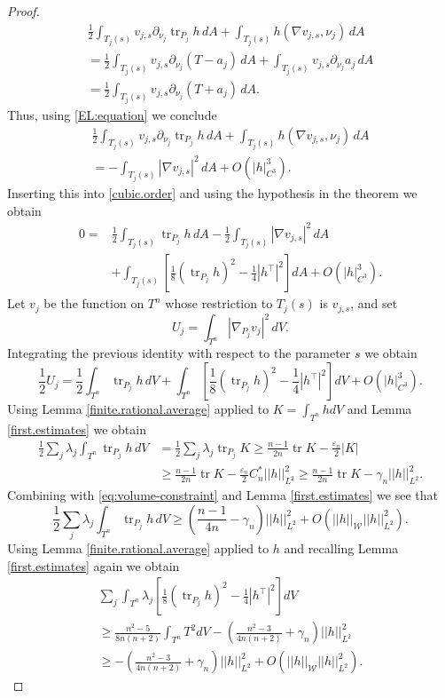 \documentclass[11pt]{amsart}
\def\tr{\operatorname{tr}}
\theoremstyle{remark}
\theoremstyle{definition}
\begin{document}
\begin{proof}
\begin{multline*}
			\frac12\int_{T_{j}(s)}v_{j,s}\partial_{\nu_j}\tr _{P_j} h\,dA+\int_{T_{j}(s)} h(\nabla v_{j,s},\nu_j)\,dA
			\\
			=\frac12\int_{T_{j}(s)}v_{j,s}\partial_{\nu_j}(T-a_j)\,dA+\int_{T_{j}(s)} v_{j,s}\partial_{\nu_j}a_j\,dA
			\\
			=\frac12\int_{T_{j}(s)}v_{j,s}\partial_{\nu_j}(T+a_j)\,dA.
		\end{multline*}
		Thus, using \eqref{EL:equation} we conclude
		\begin{multline*}
			\frac12\int_{T_{j}(s)}v_{j,s}\partial_{\nu_j}\tr _{P_j} h\,dA+\int_{T_{j}(s)} h(\nabla v_{j,s},\nu_j)\,dA\\
			=-\int_{T_{j}(s)}|\nabla v_{j,s}|^2\,dA+O(|h|_{C^3}^3).
		\end{multline*}
		Inserting this into \eqref{cubic.order} and using the hypothesis in the theorem we obtain
		$$
		\begin{aligned}
			0={}&\frac12\int_{T_{j}(s)}\tr _{P_j} h\,dA-\frac12\int_{T_{j}(s)}|\nabla v_{j,s}|^2\,dA\\
			&+\int_{T_{j}(s)}\left[\frac18(\tr _{P_j} h)^2-\frac14|h^\top|^2\right]dA+O(|h|_{C^3}^3).
		\end{aligned}
		$$
		Let $v_j$ be the function on $T^n$ whose restriction to $T_j(s)$ is $v_{j,s}$, and set
		$$
		U_j=\int_{T^n}|\nabla_{P_j}v_j|^2\,dV.
		$$
		Integrating the previous identity with respect to the parameter $s$ we obtain
		\begin{equation}\label{U.identity}
			\frac12 U_j=\frac12\int_{T^n}\tr _{P_j} h\,dV+\int_{T^n}\left[\frac18(\tr _{P_j} h)^2-\frac14|h^\top|^2\right]dV+O(|h|_{C^3}^3).
		\end{equation}
		Using Lemma \ref{finite.rational.average} applied to $K= \int_{T^n}hdV$ and  Lemma \ref{first.estimates} we obtain
		$$
		\begin{aligned}
			\frac12\sum_j\lambda_j\int_{T^n}\tr _{P_j} h\,dV&=\frac12\sum_j\lambda_j \tr_{P_j}K\geq\frac{n-1}{2n}\tr K-\frac{\varepsilon_n}{2} |K|\\
			&\geq  \frac{n-1}{2n}\tr K-\frac{\varepsilon_n}{2}C^*_n ||h||^2_{L^2}\!\!\geq\frac{n-1}{2n}\tr K-\gamma_n ||h||^2_{L^2}.
		\end{aligned}
		$$
		Combining with \eqref{eq:volume-constraint} and Lemma \ref{first.estimates}  we see that
		$$
		\frac12\sum_j\lambda_j\int_{T^n}\tr _{P_j} h\,dV\geq \left(\frac{n-1}{4n}-\gamma_n\right)||h||^2_{L^2}+O(||h||_{\mathcal W}||h||_{L^2}^2).
		$$
		Using Lemma \ref{finite.rational.average} applied to $h$ and recalling Lemma \ref{first.estimates} again we obtain 
		\begin{multline*}
			\sum_j\int_{T^n}\lambda_j\left[\frac18(\tr _{P_j} h)^2-\frac14|h^\top|^2\right]dV\\
			\geq \frac{n^2-5}{8n(n+2)}\int_{T^n}T^2dV-\left(\frac{n^2-3}{4n(n+2)}+\gamma_n\right)||h||^2_{L^2}\\
			\geq -\left(\frac{n^2-3}{4n(n+2)}+\gamma_n\right)||h||^2_{L^2}+O(||h||_{\mathcal W}||h||^2_{L^2}).
		\end{multline*}
		

\end{proof}
\end{document}
